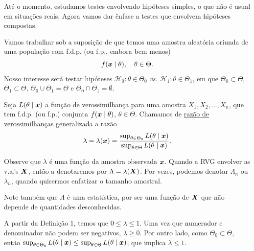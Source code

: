 
Até o momento, estudamos testes envolvendo hipóteses simples, o que não é usual em situações reais. Agora vamos dar ênfase a testes que envolvem hipóteses compostas.

Vamos trabalhar sob a suposição de que temos uma amostra aleatória oriunda de uma população com f.d.p. (ou f.p., embora bem menos)
\begin{equation}
f(\bm{x}\mid\theta), \quad \theta\in\Theta.
\end{equation}
Nosso interesse será testar hipóteses $\mathcal{H}_0:\theta\in\Theta_0$ \emph{vs.} $\mathcal{H}_1:\theta\in\Theta_1$, em que $\Theta_0\subset\Theta$, $\Theta_1\subset\Theta$, $\Theta_0\cup\Theta_1=\Theta$ e $\Theta_0\cap\Theta_1=\emptyset$.

\begin{definition}
Seja $L(\theta\mid\bm{x})$ a função de verossimilhança para uma amostra $X_1,X_2,\ldots,X_n$, que tem f.d.p. (ou f.p.) conjunta $f(\bm{x}\mid\theta)$, $\theta\in\Theta$. Chamamos de \uline{razão de verossimilhanças generalizada} a razão
\begin{equation}
\lambda=\lambda(\bm{x})=\frac{\sup_{\theta\in\Theta_0}L(\theta\mid\bm{x})}{\sup_{\theta\in\Theta}L(\theta\mid\bm{x})}.
\end{equation}
\end{definition}

Observe que $\lambda$ é uma função da amostra observada $\bm{x}$. Quando a RVG envolver as v.a.'s $\bm{X}$, então a denotaremos por $\Lambda=\lambda(\bm{X})$. Por vezes, podemos denotar $\Lambda_n$ ou $\lambda_n$, quando quisermos enfatizar o tamanho amostral.

Note também que $\Lambda$ é uma estatística, por ser uma função de $\bm{X}$ que não depende de quantidades desconhecidas.

A partir da Definição 1, temos que $0\leq\lambda\leq1$. Uma vez que numerador e denominador não podem ser negativos, $\lambda\geq0$. Por outro lado, como $\Theta_0\subset\Theta$, então $\sup_{\theta\in\Theta_0}L(\theta\mid\bm{x})\leq\sup_{\theta\in\Theta}L(\theta\mid\bm{x})$, que implica $\lambda\leq1$.

